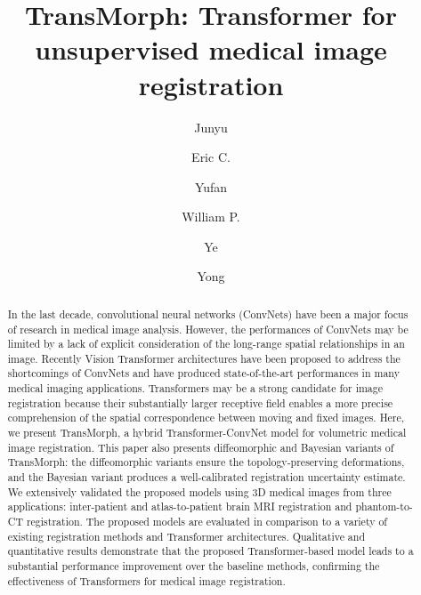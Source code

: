 \documentclass[times,twocolumn,final]{elsarticle}
\begin{document}

\begin{frontmatter}

\title{TransMorph: Transformer for unsupervised medical image registration}

\author[1,2]{Junyu }
\author[1,2]{Eric C. }
\author[5]{Yufan }
\author[3]{William P. }
\author[4]{Ye }
\author[1]{Yong }
\address[1]{Russell H. Morgan Department of Radiology and Radiological Science, Johns Hopkins Medical Institutes, Baltimore, MD, USA}
\address[2]{Department of Electrical and Computer Engineering, Johns Hopkins University, Baltimore, MD, USA}
\address[3]{Carl E. Ravin Advanced Imaging Laboratories, Department of Radiology, Duke University Medical Center, Durham, NC, USA}
\address[4]{Center for Advanced Medical Computing and Analysis, Massachusetts General Hospital and Harvard Medical School, Boston, MA, USA}
\address[5]{NVIDIA Corporation, Bethesda, MD, USA}





\begin{abstract}
In the last decade, convolutional neural networks (ConvNets) have been a major focus of research in medical image analysis. However, the performances of ConvNets may be limited by a lack of explicit consideration of the long-range spatial relationships in an image. Recently Vision Transformer architectures have been proposed to address the shortcomings of ConvNets and have produced state-of-the-art performances in many medical imaging applications. Transformers may be a strong candidate for image registration because their substantially larger receptive field enables a more precise comprehension of the spatial correspondence between moving and fixed images. Here, we present TransMorph, a hybrid Transformer-ConvNet model for volumetric medical image registration. This paper also presents diffeomorphic and Bayesian variants of TransMorph: the diffeomorphic variants ensure the topology-preserving deformations, and the Bayesian variant produces a well-calibrated registration uncertainty estimate. We extensively validated the proposed models using 3D medical images from three applications: inter-patient and atlas-to-patient brain MRI registration and phantom-to-CT registration. The proposed models are evaluated in comparison to a variety of existing registration methods and Transformer architectures. Qualitative and quantitative results demonstrate that the proposed Transformer-based model leads to a substantial performance improvement over the baseline methods, confirming the effectiveness of Transformers for medical image registration.
\end{abstract}


\end{frontmatter}
\end{document}
